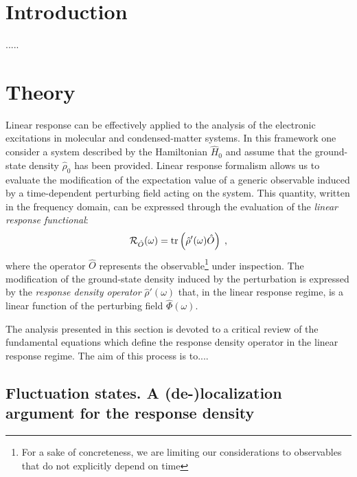 \documentclass[reprint,aps,prb]{revtex4-1}
\newcommand{\be}{\begin{equation}}
\newcommand{\ee}{\end{equation}}
\newcommand{\lb}{\label}
\newcommand{\op}[1]{\hat {#1}}
\newcommand{\trace}[1]{\mathrm{tr}\left(#1\right)}
\newcommand{\dmnot}{\op{\rho}_0}
\newcommand{\dm}{\op{\rho}}
\newcommand{\hnot}{\op{H}_0}
\begin{document}
\section{Introduction}

.....

\section{Theory}

Linear response can be effectively applied to the analysis of the electronic excitations in molecular and condensed-matter systems. In this framework one consider a system 
described by the Hamiltonian $\hnot$ and assume that the ground-state density $\dmnot$ has been provided. Linear response formalism allows us to evaluate the modification 
of the expectation value of a generic observable induced by a time-dependent perturbing field acting on the system. This quantity, written in the frequency domain, can be expressed 
through the evaluation of the \emph{linear response functional}:
\be\lb{LinearResponseFunctDef1}
{\cal R}_{\op O}(\omega) = \trace{\dm'(\omega)\op O} \;,
\ee
where the operator $\op O$ represents the observable\footnote{For a sake of concreteness, we are limiting our considerations to observables that do not explicitly depend on time} 
under inspection. The modification of the ground-state density induced by the perturbation is expressed by the \emph{response density operator} $\dm'(\omega)$ that, in the linear 
response regime, is a linear function of the perturbing field $\op\Phi(\omega)$.

The analysis presented in this section is devoted to a critical review of the fundamental equations which define the response density operator in the linear response regime.    
The aim of this process is to....


\subsection{Fluctuation states. A (de-)localization argument for the response density}
\end{document}
